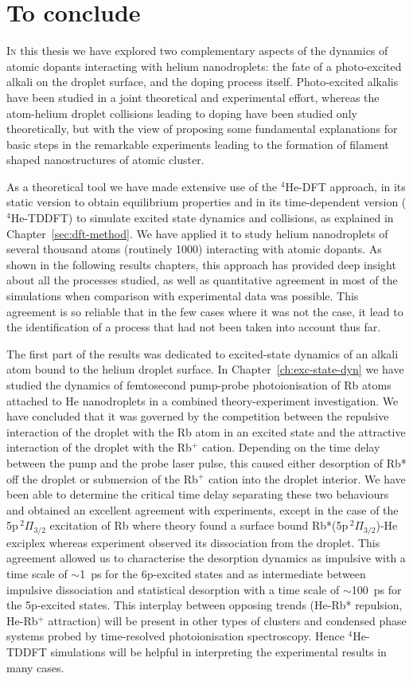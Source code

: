 \chapter{To conclude}
	\lettrine[lines=4]{\color{activeColor}I}{n} this thesis we have explored two complementary aspects of the dynamics of atomic dopants interacting with helium nanodroplets: the fate of a photo-excited alkali on the droplet surface, and the doping process itself. Photo-excited alkalis have been studied in a joint theoretical and experimental effort, whereas the atom-helium droplet collisions leading to doping have been studied only theoretically, but with the view of proposing some fundamental explanations for basic steps in the remarkable experiments leading to the formation of filament shaped nanostructures of atomic cluster.

	As a theoretical tool we have made extensive use of the $^4$He-DFT approach, in its static version to obtain equilibrium properties and in its time-dependent version ($^4$He-TDDFT) to simulate excited state dynamics and collisions, as explained in Chapter~\ref{sec:dft-method}. We have applied it to study helium nanodroplets of several thousand atoms (routinely 1000) interacting with atomic dopants. As shown in the following results chapters, this approach has provided deep insight about all the processes studied, as well as quantitative agreement in most of the simulations when comparison with experimental data was possible. This agreement is so reliable that in the few cases where it was not the case, it lead to the identification of a process that had not been taken into account thus far.

	The first part of the results was dedicated to excited-state dynamics of an alkali atom bound to the helium droplet surface. In Chapter~\ref{ch:exc-state-dyn} we have studied the dynamics of femtosecond pump-probe photoionisation of Rb atoms attached to He nanodroplets in a combined theory-experiment investigation. We have concluded that it was governed by the competition between the repulsive interaction of the droplet with the Rb atom in an excited state and the attractive interaction of the droplet with the Rb$^+$ cation. Depending on the time delay between the pump and the probe laser pulse, this caused either desorption of Rb* off the droplet or submersion of the Rb$^+$ cation into the droplet interior. We have been able to determine the critical time delay separating these two behaviours and obtained an excellent agreement with experiments, except in the case of the 5p$\,^2\Pi_{3/2}$ excitation of Rb where theory found a surface bound Rb*(5p$\,^2\Pi_{3/2}$)-He exciplex whereas experiment observed its dissociation from the droplet. This agreement allowed us to characterise the desorption dynamics as impulsive with a time scale of $\sim$1~ps for the 6p-excited states and as intermediate between impulsive dissociation and statistical desorption with a time scale of $\sim$100~ps for the 5p-excited states. This interplay between opposing trends (He-Rb* repulsion, He-Rb$^+$ attraction) will be present in other types of clusters and condensed phase systems probed by time-resolved photoionisation spectroscopy. Hence $^4$He-TDDFT simulations will be helpful in interpreting the experimental results in many cases.

